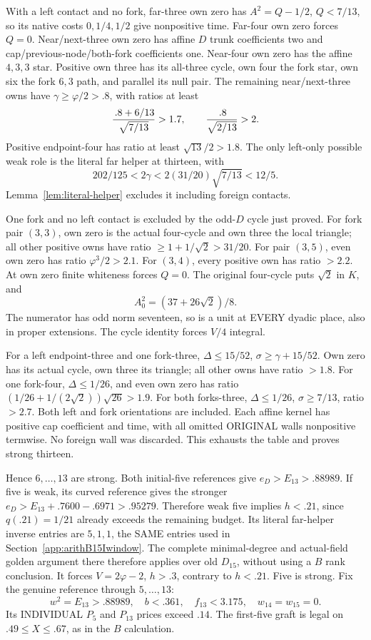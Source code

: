 With a left contact and no fork, far-three own zero
has \(A^2=Q-1/2\), \(Q<7/13\), so its native
costs \(0,1/4,1/2\) give nonpositive time.
Far-four own zero forces \(Q=0\).
Near/next-three own zero has affine \(D\) trunk
coefficients two and cap/previous-node/both-fork
coefficients one.
Near-four own zero has the affine \(4,3,3\) star.
Positive own three has its all-three cycle,
own four the fork star, own six the fork \(6,3\)
path, and parallel its null pair.
The remaining near/next-three owns have
\(\gamma\ge\varphi/2>.8\), with ratios at least
\[
 {\, .8+6/13\over\sqrt{7/13}}>1.7,\qquad
 {\, .8\over\sqrt{2/13}}>2.
\]
Positive endpoint-four has ratio at least
\(\sqrt{13}/2>1.8\).
The only left-only possible weak role is the literal
far helper at thirteen, with
\[
       202/125<2\gamma<2(31/20)\sqrt{7/13}<12/5.
\]
Lemma~\ref{lem:literal-helper} excludes it including
foreign contacts.

One fork and no left contact is excluded by the
odd-\(D\) cycle just proved.
For fork pair \((3,3)\), own zero is the actual
four-cycle and own three the local triangle;
all other positive owns have ratio
\(\ge1+1/\sqrt2>31/20\).
For pair \((3,5)\), even own zero has ratio
\(\varphi^3/2>2.1\).
For \((3,4)\), every positive own has ratio \(>2.2\).
At own zero finite whiteness forces \(Q=0\).
The original four-cycle puts \(\sqrt2\) in \(K\),
and
\[
                      A_0^2=(37+26\sqrt2)/8 .
\]
The numerator has odd norm seventeen, so is a unit
at EVERY dyadic place, also in proper extensions.
The cycle identity forces \(V/4\) integral.

For a left endpoint-three and one fork-three,
\(\Delta\le15/52\), \(\sigma\ge\gamma+15/52\).
Own zero has its actual cycle, own three its triangle;
all other owns have ratio \(>1.8\).
For one fork-four,
\(\Delta\le1/26\), and even own zero has ratio
\((1/26+1/(2\sqrt2))\sqrt{26}>1.9\).
For both forks-three,
\(\Delta\le1/26\), \(\sigma\ge7/13\), ratio \(>2.7\).
Both left and fork orientations are included.
Each affine kernel has positive cap coefficient and
time, with all omitted ORIGINAL walls nonpositive
termwise.  No foreign wall was discarded.
This exhausts the table and proves strong thirteen.

Hence \(6,\ldots,13\) are strong.
Both initial-five references give \(e_D>E_{13}>.88989\).
If five is weak, its curved reference gives the stronger
\(e_D>E_{13}+.7600-.6971>.95279\).
Therefore weak five implies \(h<.21\), since
\(q(.21)=1/21\) already exceeds the remaining budget.
Its literal far-helper inverse entries are \(5,1,1\),
the SAME entries used in Section~\ref{app:arithB15Iwindow}.
The complete minimal-degree and actual-field golden
argument there therefore applies over old \(D_{15}\),
without using a \(B\) rank conclusion.
It forces \(V=2\varphi-2\), \(h>.3\), contrary to
\(h<.21\).
Five is strong.
Fix the genuine reference through \(5,\ldots,13\):
\[
 w^2=E_{13}>.88989,\quad
 b<.361,\quad f_{13}<3.175,\quad
 w_{14}=w_{15}=0.
\]
Its INDIVIDUAL \(P_5\) and \(P_{13}\) prices exceed
\(.14\).  The first-five graft is legal on
\(.49\le X\le.67\), as in the \(B\) calculation.

